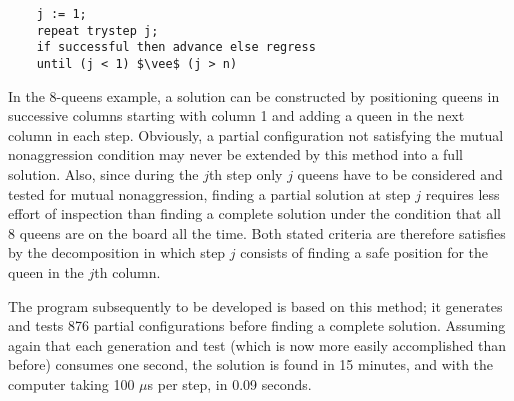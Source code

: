 \begin{lstlisting}
    j := 1;
    repeat trystep j;
    if successful then advance else regress
    until (j < 1) $\vee$ (j > n)
\end{lstlisting}

In the 8-queens example, a solution can be constructed by positioning queens in
successive columns starting with column 1 and adding a queen in the next column
in each step.  Obviously, a partial configuration not satisfying the mutual
nonaggression condition may never be extended by this method into a full
solution.  Also, since during the $j$th step only $j$ queens have to be
considered and tested for mutual nonaggression, finding a partial solution at
step $j$ requires less effort of inspection than finding a complete solution
under the condition that all 8 queens are on the board all the time.  Both
stated criteria are therefore satisfies by the decomposition in which step $j$
consists of finding a safe position for the queen in the $j$th column.

The program subsequently to be developed is based on this method; it generates
and tests 876 partial configurations before finding a complete solution.
Assuming again that each generation and test (which is now more easily
accomplished than before) consumes one second, the solution is found in 15
minutes, and with the computer taking 100 $\mu$s per step, in 0.09 seconds.
